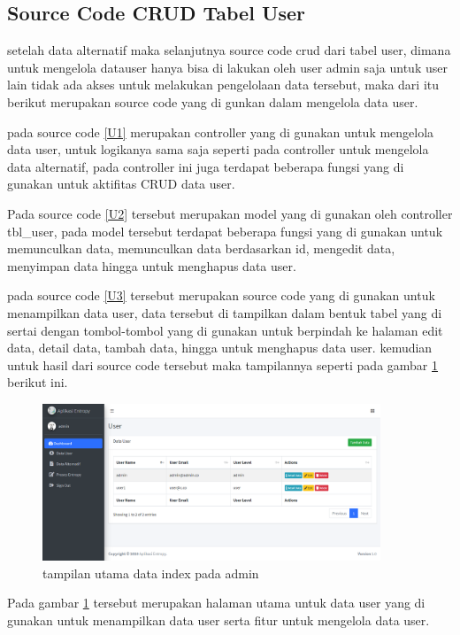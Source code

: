 \subsection{Source Code CRUD Tabel User}
	setelah data alternatif maka selanjutnya source code crud dari tabel user, dimana untuk mengelola datauser hanya bisa di lakukan oleh user admin saja untuk user lain tidak ada akses untuk melakukan pengelolaan data tersebut, maka dari itu berikut merupakan source code yang di gunkan dalam mengelola data user.

	pada source code \ref{U1} merupakan controller yang di gunakan untuk mengelola data user, untuk logikanya sama saja seperti pada controller untuk mengelola data alternatif, pada controller ini juga terdapat beberapa fungsi yang di gunakan untuk aktifitas CRUD data user.

	Pada source code \ref{U2} tersebut merupakan model yang di gunakan oleh controller tbl\_user, pada model tersebut terdapat beberapa fungsi yang di gunakan untuk memunculkan data, memunculkan data berdasarkan id, mengedit data, menyimpan data hingga untuk menghapus data user.

	pada source code \ref{U3} tersebut merupakan source code yang di gunakan untuk menampilkan data user, data tersebut di tampilkan dalam bentuk tabel yang di sertai dengan tombol-tombol yang di gunakan untuk berpindah ke halaman edit data, detail data, tambah data, hingga untuk menghapus data user. kemudian untuk hasil dari source code tersebut maka tampilannya seperti pada gambar \ref{ve13} berikut ini.\par
\pagebreak
\begin{figure}[!htbp]
	\centerline{\includegraphics[width=0.90\textwidth]{figures/us/idx.png}}
	\caption{tampilan utama data index pada admin}
	\label{ve13}
\end{figure}
Pada gambar \ref{ve13} tersebut merupakan halaman utama untuk data user yang di gunakan untuk menampilkan data user serta fitur untuk mengelola data user.


